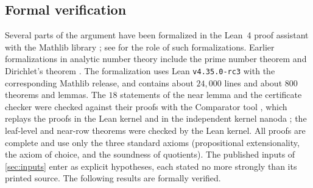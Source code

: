 \subsection{Formal verification}\label{subsec:lean}
Several parts of the argument have been formalized in the Lean~4 proof assistant
\cite{deMouraUllrich2021lean} with the Mathlib library \cite{mathlib2020lean}; see
\cite{Avigad2024mathematics} for the role of such formalizations. Earlier formalizations in
analytic number theory include the prime number theorem
\cite{AvigadDonnellyGrayRaff2007formally,Harrison2009formalizing,KontorovichTao2024pnt} and
Dirichlet's theorem \cite{Stoll2024dirichlet}. The formalization uses Lean \texttt{v4.35.0-rc3} with
the corresponding Mathlib release, and contains about $24{,}000$ lines and about $800$ theorems and
lemmas. The $18$ statements of the near lemma and the certificate checker were checked against
their proofs with the Comparator tool \cite{LeanFRO2025comparator}, which replays the proofs in the
Lean kernel and in the independent kernel nanoda \cite{Bailey2020nanoda}; the leaf-level and near-row
theorems were checked by the Lean kernel. All proofs are complete and use only the
three standard axioms (propositional extensionality, the axiom of choice, and the soundness of
quotients). The published inputs of \cref{sec:inputs} enter as explicit hypotheses, each stated
no more strongly than its printed source. The following results are formally verified.
